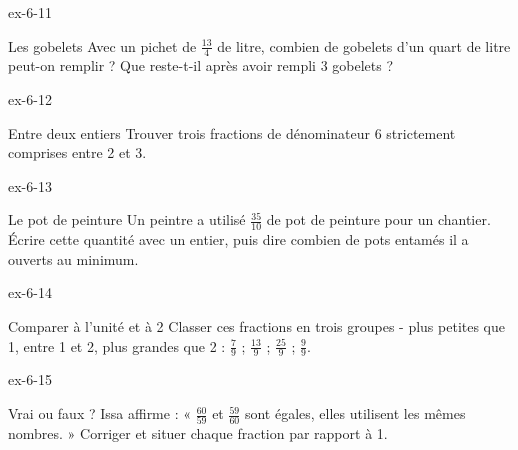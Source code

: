 \begin{blocLivre}{ex-6-11}\begin{exercice}[3]{Les gobelets}
Avec un pichet de $\frac{13}4$ de litre, combien de gobelets d’un quart de litre peut-on remplir ? Que reste-t-il après avoir rempli 3 gobelets ?
\end{exercice}\end{blocLivre}
\begin{blocLivre}{ex-6-12}\begin{exercice}[3]{Entre deux entiers}
Trouver trois fractions de dénominateur 6 strictement comprises entre 2 et 3.
\end{exercice}\end{blocLivre}
\begin{blocLivre}{ex-6-13}\begin{exercice}[3]{Le pot de peinture}
Un peintre a utilisé $\frac{35}{10}$ de pot de peinture pour un chantier. Écrire cette quantité avec un entier, puis dire combien de pots entamés il a ouverts au minimum.
\end{exercice}\end{blocLivre}
\begin{blocLivre}{ex-6-14}\begin{exercice}[3]{Comparer à l’unité et à 2}
Classer ces fractions en trois groupes - plus petites que 1, entre 1 et 2, plus grandes que 2 : $\frac79$ ; $\frac{13}9$ ; $\frac{25}9$ ; $\frac99$.
\end{exercice}\end{blocLivre}
\begin{blocLivre}{ex-6-15}\begin{exercice}[3]{Vrai ou faux ?}
Issa affirme : « $\frac{60}{59}$ et $\frac{59}{60}$ sont égales, elles utilisent les mêmes nombres. » Corriger et situer chaque fraction par rapport à 1.
\end{exercice}\end{blocLivre}

\clearpage
